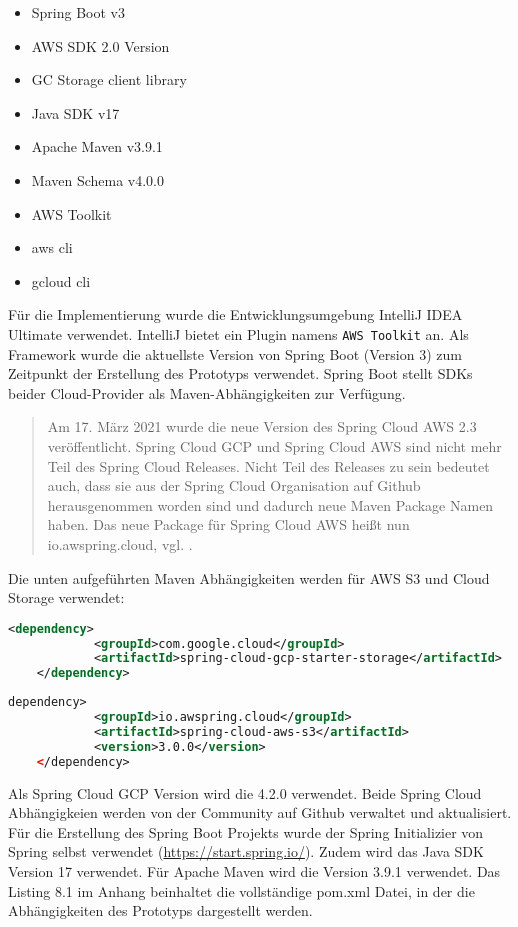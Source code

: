 \begin{itemize}
	\item Spring Boot v3
	\item AWS SDK 2.0 Version
	\item GC Storage client library
	\item Java SDK v17
	\item Apache Maven v3.9.1
	\item Maven Schema v4.0.0
	\item AWS Toolkit
	\item aws cli
	\item gcloud cli
\end{itemize}

Für die Implementierung wurde die Entwicklungsumgebung IntelliJ IDEA Ultimate verwendet. IntelliJ bietet ein Plugin namens \verb|AWS Toolkit| an. Als Framework wurde die aktuellste Version von Spring Boot (Version 3) zum Zeitpunkt der Erstellung des Prototyps verwendet. Spring Boot stellt SDKs beider Cloud-Provider als Maven-Abhängigkeiten zur Verfügung.

\begin{quote}
	Am 17. März 2021 wurde die neue Version des Spring Cloud AWS 2.3 veröffentlicht. Spring Cloud GCP und Spring Cloud AWS sind nicht mehr Teil des Spring Cloud Releases. Nicht Teil des Releases zu sein bedeutet auch, dass sie aus der Spring Cloud Organisation auf Github herausgenommen worden sind und dadurch neue Maven Package Namen haben. Das neue Package für Spring Cloud AWS heißt nun \glqq io.awspring.cloud\grqq, vgl. \cite{spring-cloud-announce}. 
\end{quote}

Die unten aufgeführten Maven Abhängigkeiten werden für AWS S3 und Cloud Storage verwendet:

\begin{lstlisting}[language=XML]
	<dependency>
        	<groupId>com.google.cloud</groupId>
        	<artifactId>spring-cloud-gcp-starter-storage</artifactId>
    </dependency>
\end{lstlisting}

\begin{lstlisting}[language=XML]
	dependency>
        	<groupId>io.awspring.cloud</groupId>
        	<artifactId>spring-cloud-aws-s3</artifactId>
        	<version>3.0.0</version>
    </dependency>
\end{lstlisting}

Als Spring Cloud GCP Version wird die 4.2.0 verwendet. Beide Spring Cloud Abhängigkeien werden von der Community auf Github verwaltet und aktualisiert. Für die Erstellung des Spring Boot Projekts wurde der Spring Initializier von Spring selbst verwendet (\url{https://start.spring.io/}). Zudem wird das Java SDK Version 17 verwendet. Für Apache Maven wird die Version 3.9.1 verwendet. Das Listing 8.1 im Anhang beinhaltet die vollständige pom.xml Datei, in der die Abhängigkeiten des Prototyps dargestellt werden.

